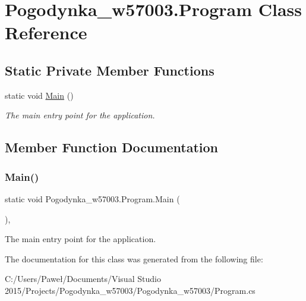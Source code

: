 \hypertarget{class_pogodynka__w57003_1_1_program}{}\section{Pogodynka\+\_\+w57003.\+Program Class Reference}
\label{class_pogodynka__w57003_1_1_program}
\subsection*{Static Private Member Functions}
\begin{DoxyCompactItemize}
\item 
static void \mbox{\hyperlink{class_pogodynka__w57003_1_1_program_a421ba380fb77102b1b2f51f792687447}{Main}} ()
\begin{DoxyCompactList}\small\item\em The main entry point for the application. \end{DoxyCompactList}\end{DoxyCompactItemize}


\subsection{Member Function Documentation}
\mbox{\label{class_pogodynka__w57003_1_1_program_a421ba380fb77102b1b2f51f792687447}} 
\subsubsection{\texorpdfstring{Main()}{Main()}}
{\footnotesize\ttfamily static void Pogodynka\+\_\+w57003.\+Program.\+Main (\begin{DoxyParamCaption}{ }\end{DoxyParamCaption})\hspace{0.3cm}{\ttfamily [static]}, {\ttfamily [private]}}



The main entry point for the application. 



The documentation for this class was generated from the following file\+:\begin{DoxyCompactItemize}
\item 
C\+:/\+Users/\+Paweł/\+Documents/\+Visual Studio 2015/\+Projects/\+Pogodynka\+\_\+w57003/\+Pogodynka\+\_\+w57003/Program.\+cs\end{DoxyCompactItemize}
